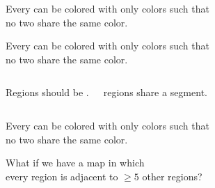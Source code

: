 
\begin{frame}
\end{frame}

\begin{frame}{}
  \begin{theorem}
    Every  can be colored with only  colors such that \\
    no two   share the same color.
  \end{theorem}

  \pause
\end{frame}

\begin{frame}{}
  \begin{theorem}
    Every  can be colored with only  colors such that \\
    no two   share the same color.
  \end{theorem}

  \begin{columns}
      \pause
        \begin{center}
          {Regions should be .}
        \end{center}
      \pause
      \begin{center}
         regions share a segment.
      \end{center}
  \end{columns}
\end{frame}

\begin{frame}{}
  \begin{theorem}
    Every  can be colored with only  colors such that \\
    no two   share the same color.
  \end{theorem}

  \pause

  \pause
  \begin{center}
    What if we have a map in which \\
    every region is adjacent to $\ge 5$ other regions?
  \end{center}
\end{frame}

